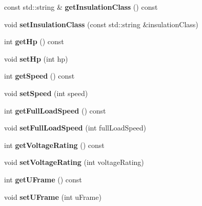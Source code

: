 \begin{DoxyCompactItemize}
const std\+::string \& {\bfseries get\+Insulation\+Class} () const
\item 
\mbox{\label{class_motor_data_a85cf8f4df6cacf6c637a3764a8a09dbf}} 
void {\bfseries set\+Insulation\+Class} (const std\+::string \&insulation\+Class)
\item 
\mbox{\label{class_motor_data_a4815d7d856deb37f89ed415ae8997948}} 
int {\bfseries get\+Hp} () const
\item 
\mbox{\label{class_motor_data_ac27f7062a26c94e29c25219883aa2915}} 
void {\bfseries set\+Hp} (int hp)
\item 
\mbox{\label{class_motor_data_a0385467a61f357c7d10fd70e22372afb}} 
int {\bfseries get\+Speed} () const
\item 
\mbox{\label{class_motor_data_a27f9f3513065e478edcf0342938059ec}} 
void {\bfseries set\+Speed} (int speed)
\item 
\mbox{\label{class_motor_data_ad1ba66ba5af859acaea57a91a7916626}} 
int {\bfseries get\+Full\+Load\+Speed} () const
\item 
\mbox{\label{class_motor_data_af6c25bd37ff58634fcf4885ada9fc1d1}} 
void {\bfseries set\+Full\+Load\+Speed} (int full\+Load\+Speed)
\item 
\mbox{\label{class_motor_data_a3ede25b7319b0d58af591c7737a56c43}} 
int {\bfseries get\+Voltage\+Rating} () const
\item 
\mbox{\label{class_motor_data_a335c9f5f1326dbf28bd9d7a652949d1f}} 
void {\bfseries set\+Voltage\+Rating} (int voltage\+Rating)
\item 
\mbox{\label{class_motor_data_aaee859b8d0bebd675a696e710efc3c35}} 
int {\bfseries get\+U\+Frame} () const
\item 
\mbox{\label{class_motor_data_a34fdfe66af559bb3d8e619b13d9dae11}} 
void {\bfseries set\+U\+Frame} (int u\+Frame)
\item 

\end{DoxyCompactItemize}
